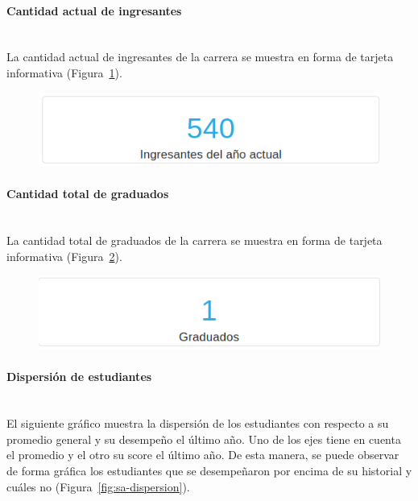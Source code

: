 \paragraph{Cantidad actual de ingresantes} \mbox{}\\
La cantidad actual de ingresantes de la carrera se muestra en forma de tarjeta informativa (Figura~\ref{fig:sa-ingresantes}).

\begin{figure}[H]
  \centering
    \includegraphics[scale=0.4]{images/seguimiento-academico/sa-ingresantes.png}
  \label{fig:sa-ingresantes}
\end{figure}

\paragraph{Cantidad total de graduados} \mbox{}\\
La cantidad total de graduados de la carrera se muestra en forma de tarjeta informativa (Figura~\ref{fig:sa-graduados}).

\begin{figure}[H]
  \centering
    \includegraphics[scale=0.4]{images/seguimiento-academico/sa-graduados.png}
  \label{fig:sa-graduados}
\end{figure}

\paragraph{Dispersión de estudiantes} \mbox{}\\
El siguiente gráfico muestra la dispersión de los estudiantes con respecto a su promedio general y su desempeño el último año. Uno de los ejes tiene en cuenta el promedio y el otro su score el último año. De esta manera, se puede observar de forma gráfica los estudiantes que se desempeñaron por encima de su historial y cuáles no (Figura~\ref{fig:sa-dispersion}).

